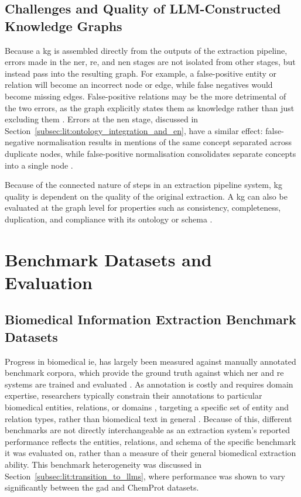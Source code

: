 \subsection{Challenges and Quality of LLM-Constructed Knowledge Graphs}
\label{subsec:lit:challenges_and_quality_of_llm_kgs}
Because a \gls{kg} is assembled directly from the outputs of the extraction pipeline, errors made in the \gls{ner}, \gls{re}, and \gls{nen} stages are not isolated from other stages, but instead pass into the resulting graph. For example, a false-positive entity or relation will become an incorrect node or edge, while false negatives would become missing edges. False-positive relations may be the more detrimental of the two errors, as the graph explicitly states them as knowledge rather than just excluding them \pref. Errors at the \gls{nen} stage, discussed in Section~\ref{subsec:lit:ontology_integration_and_en}, have a similar effect: false-negative normalisation results in mentions of the same concept separated across duplicate nodes, while false-positive normalisation consolidates separate concepts into a single node \pref.

Because of the connected nature of steps in an extraction pipeline system, \gls{kg} quality is dependent on the quality of the original extraction. A \gls{kg} can also be evaluated at the graph level for properties such as consistency, completeness, duplication, and compliance with its ontology or schema \pref.

\section{Benchmark Datasets and Evaluation}
\label{sec:lit:Benchmark Datasets and Evaluation}

\subsection{Biomedical Information Extraction Benchmark Datasets}
\label{subsec:lit:biomed_ie_benchmark_datasets}
Progress in biomedical \gls{ie}, has largely been measured against manually annotated benchmark corpora, which provide the ground truth against which \gls{ner} and \gls{re} systems are trained and evaluated \pref. As annotation is costly and requires domain expertise, researchers typically constrain their annotations to particular biomedical entities, relations, or domains \pref, targeting a specific set of entity and relation types, rather than biomedical text in general \pref. Because of this, different benchmarks are not directly interchangeable as an extraction system's reported performance reflects the entities, relations, and schema of the specific benchmark it was evaluated on, rather than a measure of their general biomedical extraction ability. This benchmark heterogeneity was discussed in Section~\ref{subsec:lit:transition_to_llms}, where performance was shown to vary significantly between the \gls{gad} and ChemProt datasets.

